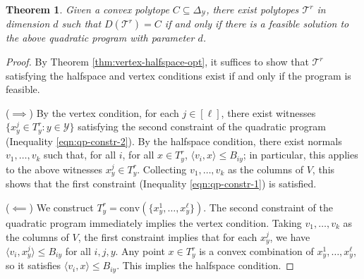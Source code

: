 \documentclass[12pt]{article}
\newcommand{\simplex}{\Delta_\Y}
\newcommand{\T}{\mathcal{T}}
\newcommand{\Y}{\mathcal{Y}}
\newcommand{\inprod}[2]{\langle #1, #2 \rangle}%
\newcommand{\conv}{\mathrm{conv}}
\newtheorem{theorem}{Theorem}
\begin{document}
  \begin{theorem}
  	Given a convex polytope $C \subseteq \simplex$, there exist polytopes $\T^r$ in dimension $d$ such that $D(\T^r) = C$ if and only if there is a feasible solution to the above quadratic program with parameter $d$.
  \end{theorem}
  \begin{proof}
    By Theorem \ref{thm:vertex-halfspace-opt}, it suffices to show that $\T^r$ satisfying the halfspace and vertex conditions exist if and only if the program is feasible.

    ($\implies$) 
    By the vertex condition, for each $j \in [\ell]$, there exist witnesses $\{x^j_y \in T^r_y : y \in \Y\}$ satisfying the second constraint of the quadratic program (Inequality \ref{eqn:qp-constr-2}).
    By the halfspace condition, there exist normals $v_1, \dots, v_k$ such that, for all $i$, for all $x \in T^r_y$, $\inprod{v_i}{x} \leq B_{iy}$; in particular, this applies to the above witnesses $x^j_y \in T^r_y$.
    Collecting $v_1,\dots,v_k$ as the columns of $V$, this shows that the first constraint (Inequality \ref{eqn:qp-constr-1}) is satisfied.

    \bigskip
    ($\impliedby$)
    We construct $T^r_y = \conv(\{x^1_y, \ldots, x^{\ell}_y\})$.
    The second constraint of the quadratic program immediately implies the vertex condition.
    Taking $v_1,\dots,v_k$ as the columns of $V$, the first constraint implies that for each $x^j_y$, we have $\inprod{v_i}{x^j_y} \leq B_{iy}$ for all $i,j,y$.
    Any point $x \in T^r_y$ is a convex combination of $x^1_y,\ldots,x^{\ell}_y$, so it satisfies $\inprod{v_i}{x} \leq B_{iy}$.
    This implies the halfspace condition.  %


\end{proof}
\end{document}
